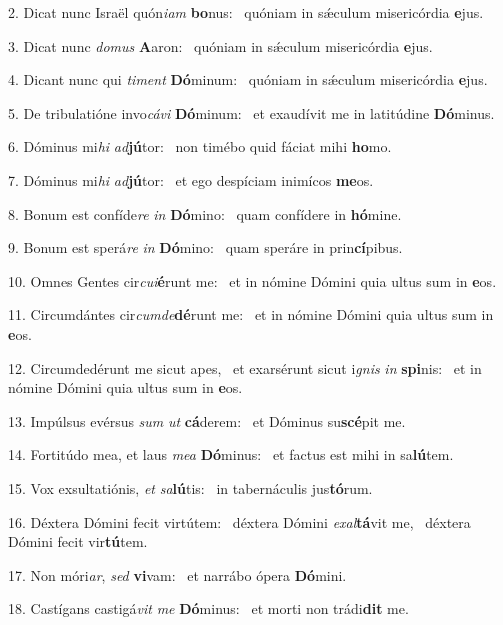 2. Dicat nunc Israël quón\textit{i}\textit{am} \textbf{bo}nus: \ast\  quóniam in sǽculum misericórdia \textbf{e}jus.\

3. Dicat nunc \textit{do}\textit{mus} \textbf{A}aron: \ast\  quóniam in sǽculum misericórdia \textbf{e}jus.\

4. Dicant nunc qui \textit{ti}\textit{ment} \textbf{Dó}minum: \ast\  quóniam in sǽculum misericórdia \textbf{e}jus.\

5. De tribulatióne invo\textit{cá}\textit{vi} \textbf{Dó}minum: \ast\  et exaudívit me in latitúdine \textbf{Dó}minus.\

6. Dóminus mi\textit{hi} \textit{ad}\textbf{jú}tor: \ast\  non timébo quid fáciat mihi \textbf{ho}mo.\

7. Dóminus mi\textit{hi} \textit{ad}\textbf{jú}tor: \ast\  et ego despíciam inimícos \textbf{me}os.\

8. Bonum est confíde\textit{re} \textit{in} \textbf{Dó}mino: \ast\  quam confídere in \textbf{hó}mine.\

9. Bonum est sperá\textit{re} \textit{in} \textbf{Dó}mino: \ast\  quam speráre in prin\textbf{cí}pibus.\

10. Omnes Gentes cir\textit{cu}\textit{i}\textbf{é}runt me: \ast\  et in nómine Dómini quia ultus sum in \textbf{e}os.\

11. Circumdántes cir\textit{cum}\textit{de}\textbf{dé}runt me: \ast\  et in nómine Dómini quia ultus sum in \textbf{e}os.\

12. Circumdedérunt me sicut apes, \dag\  et exarsérunt sicut i\textit{gnis} \textit{in} \textbf{spi}nis: \ast\  et in nómine Dómini quia ultus sum in \textbf{e}os.\

13. Impúlsus evérsus \textit{sum} \textit{ut} \textbf{cá}derem: \ast\  et Dóminus su\textbf{scé}pit me.\

14. Fortitúdo mea, et laus \textit{me}\textit{a} \textbf{Dó}minus: \ast\  et factus est mihi in sa\textbf{lú}tem.\

15. Vox exsultatiónis, \textit{et} \textit{sa}\textbf{lú}tis: \ast\  in tabernáculis jus\textbf{tó}rum.\

16. Déxtera Dómini fecit virtútem: \dag\  déxtera Dómini \textit{ex}\textit{al}\textbf{tá}vit me, \ast\  déxtera Dómini fecit vir\textbf{tú}tem.\

17. Non móri\textit{ar}, \textit{sed} \textbf{vi}vam: \ast\  et narrábo ópera \textbf{Dó}mini.\

18. Castígans castigá\textit{vit} \textit{me} \textbf{Dó}minus: \ast\  et morti non trádi\textbf{dit} me.\

